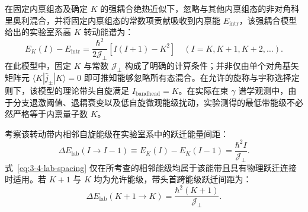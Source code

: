 在固定内禀组态及确定 $K$ 的强耦合绝热近似下，忽略与其他内禀组态的非对角科里奥利混合，并将固定内禀组态的常数项贡献吸收到内禀能 $E_{\text{intr}}$，该强耦合模型给出的实验室系高 $K$ 转动能谱为：
\begin{equation}\label{eq:3-4-high-K-spectrum}
E_K(I) - E_{\text{intr}} = \frac{\hbar^2}{2\mathcal{J}_\perp} \left[ I(I+1) - K^2 \right] \quad (I = K, K+1, K+2, \dots).
\end{equation}
在此模型中，固定 $K$ 与常数 $\mathcal{J}_\perp$ 构成了明确的计算条件；并非仅由单个对角基矢矩阵元 $\langle K | \hat{j}_\pm | K \rangle = 0$ 即可推知能够忽略所有态混合。在允许的旋称与宇称选择定则下，该模型的理论带头自旋满足 $I_{\text{bandhead}} = K$。在实际在束 $\gamma$ 谱学观测中，由于分支退激阈值、退耦衰变以及低自旋微观能级扰动，实验测得的最低带能级不必然严格等于内禀量子数 $K$。

考察该转动带内相邻自旋能级在实验室系中的跃迁能量间距：
\begin{equation}\label{eq:3-4-lab-spacing}
\Delta E_{\text{lab}}(I \to I-1) \equiv E_K(I) - E_K(I-1) = \frac{\hbar^2 I}{\mathcal{J}_\perp}.
\end{equation}
式~\eqref{eq:3-4-lab-spacing} 仅在所考查的相邻能级均属于该能带且具有物理跃迁连接时适用。若 $K+1$ 与 $K$ 均为允许能级，带头首跨能级跃迁间距为：
\begin{equation}\label{eq:3-4-first-lab-spacing}
\Delta E_{\text{lab}}(K+1 \to K) = \frac{\hbar^2 (K+1)}{\mathcal{J}_\perp}.
\end{equation}

